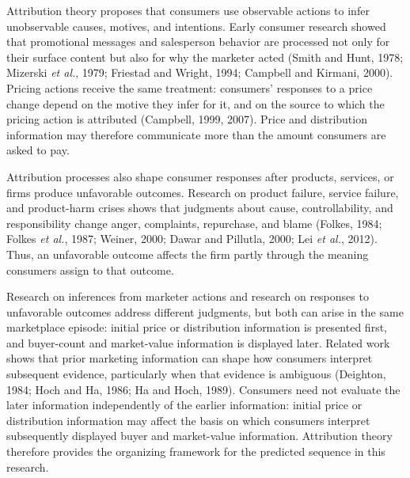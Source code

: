 \documentclass[12pt, a4paper]{article}
\begin{document}
Attribution theory proposes that consumers use observable actions to infer unobservable causes, motives, and intentions. Early consumer research showed that promotional messages and salesperson behavior are processed not only for their surface content but also for why the marketer acted (Smith and Hunt, 1978; Mizerski \emph{et al.}, 1979; Friestad and Wright, 1994; Campbell and Kirmani, 2000). Pricing actions receive the same treatment: consumers' responses to a price change depend on the motive they infer for it, and on the source to which the pricing action is attributed (Campbell, 1999, 2007). Price and distribution information may therefore communicate more than the amount consumers are asked to pay.

Attribution processes also shape consumer responses after products, services, or firms produce unfavorable outcomes. Research on product failure, service failure, and product-harm crises shows that judgments about cause, controllability, and responsibility change anger, complaints, repurchase, and blame (Folkes, 1984; Folkes \emph{et al.}, 1987; Weiner, 2000; Dawar and Pillutla, 2000; Lei \emph{et al.}, 2012). Thus, an unfavorable outcome affects the firm partly through the meaning consumers assign to that outcome.

Research on inferences from marketer actions and research on responses to unfavorable outcomes address different judgments, but both can arise in the same marketplace episode: initial price or distribution information is presented first, and buyer-count and market-value information is displayed later. Related work shows that prior marketing information can shape how consumers interpret subsequent evidence, particularly when that evidence is ambiguous (Deighton, 1984; Hoch and Ha, 1986; Ha and Hoch, 1989). Consumers need not evaluate the later information independently of the earlier information: initial price or distribution information may affect the basis on which consumers interpret subsequently displayed buyer and market-value information. Attribution theory therefore provides the organizing framework for the predicted sequence in this research.
\end{document}

